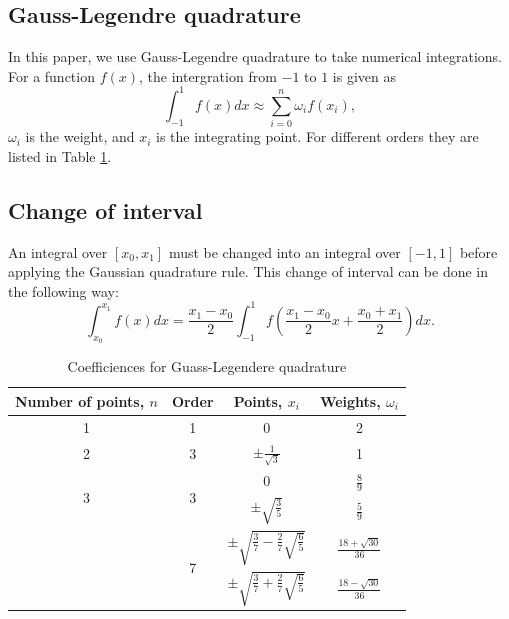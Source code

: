 \documentclass{article}
\numberwithin{equation}{section}
\numberwithin{table}{section}
\begin{document}
  \appendix
  \begin{appendices}

  \renewcommand{\appendixname}{Appendix~\Alph{section}}

  \section{Gauss-Legendre  quadrature}
  In this paper, we use Gauss-Legendre quadrature to  take  numerical integrations. 
For a function $f(x)$,  the intergration from $-1$ to $1$ is given as
$$ 
\int_{-1}^1 f(x)dx \approx \sum_{i=0}^n \omega_i f(x_i),
$$
$\omega_i$ is the weight, and $x_i$ is the integrating point.
For different orders they are listed in Table \ref{tab:coe}. 

\subsection{Change of interval}
An integral over  $[x_0,x_1]$ must be changed into an integral over $[−1, 1]$ before applying the Gaussian quadrature rule. This change of interval can be done in the following way:
$$ \int_{x_0}^{x_1}f(x) dx= \frac{x_1-x_0}{2}\int_{-1}^{1} f(\frac{x_1-x_0}{2}x+\frac{x_0+x_1}{2})dx.
 $$
 \begin{table}[htp]\label{tab:coe}
  \centering
  \caption{Coefficiences for Guass-Legendere quadrature}
  \begin{tabular}{cccc}
	\toprule
	Number of points, $n$ &  Order & Points, $x_i$ & Weights, $\omega_i$ \\
	\midrule
	1 & 1  & 0 & 2 \\
	\hline
	2 & 3  & $\pm \frac{1}{\sqrt{3}}$ & 1 \\
	\hline
	\multirow{2}{*}{3} &\multirow{2}{*}{3} & 0  & $\frac{8}{9}$ \\
	\cline{3-4}
	& & $\pm\sqrt{\frac{3}{5}}$ & $\frac{5}{9} $\\
	\hline
	\multirow{2}{*}{\makecell{4}} & \multirow{2}{*}{7}  & $\pm \sqrt{\frac{3}{7} -\frac{2}{7}\sqrt{\frac{6}{5}}}$  & $\frac{18+\sqrt{30}}{36}$ \\
	\cline{3-4}
  &  &  $\pm \sqrt{\frac{3}{7} +\frac{2}{7}\sqrt{\frac{6}{5}}}$  & $\frac{18-\sqrt{30}}{36}$ \\
  \bottomrule
\end{tabular}
\end{table}
\end{appendices}
\end{document}
